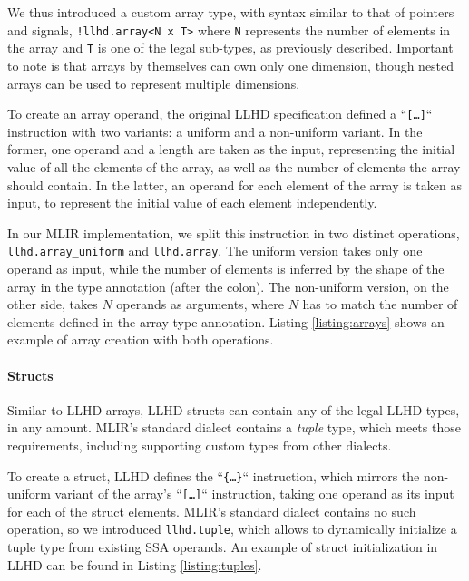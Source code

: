 We thus introduced a custom array type, with syntax similar to that of pointers and signals, \ie \texttt{!llhd.array<N x T>} where  \texttt{N} represents the number of elements in the array and \texttt{T} is one of the legal sub-types, as previously described. Important to note is that arrays by themselves can own only one dimension, though nested arrays can be used to represent multiple dimensions.

To create an array operand, the original LLHD specification defined a “\texttt{[\ldots]}“ instruction with two variants: a uniform and a non-uniform variant. In the former, one operand and a length are taken as the input, representing the initial value of all the elements of the array, as well as the number of elements the array should contain. In the latter, an operand for each element of the array is taken as input, to represent the initial value of each element independently.

In our MLIR implementation, we split this instruction in two distinct operations, \texttt{llhd.array\_uniform} and \texttt{llhd.array}. The uniform version takes only one operand as input, while the number of elements is inferred by the shape of the array in the type annotation (after the colon). The non-uniform version, on the other side, takes $N$ operands as arguments, where $N$ has to match the number of elements defined in the array type annotation. Listing \ref{listing:arrays} shows an example of array creation with both operations.


\paragraph{Structs}
Similar to LLHD arrays, LLHD structs can contain any of the legal LLHD types, in any amount. MLIR's standard dialect contains a \textit{tuple} type, which meets those requirements, including supporting custom types from other dialects.

To create a struct, LLHD defines the “\texttt{\{\ldots\}}“ instruction, which mirrors the non-uniform variant of the array's “\texttt{[\ldots]}“ instruction, taking one operand as its input for each of the struct elements. MLIR's standard dialect contains no such operation, so we introduced \texttt{llhd.tuple}, which allows to dynamically initialize a tuple type from existing SSA operands. An example of struct initialization in LLHD can be found in Listing \ref{listing:tuples}.

